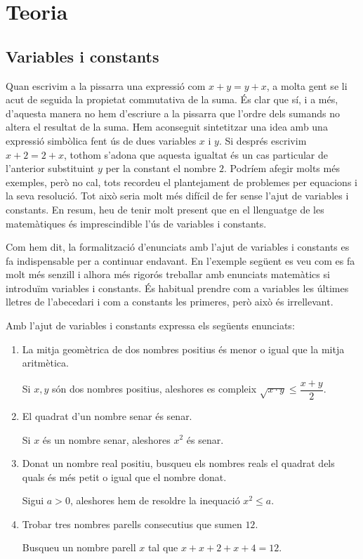 \chapter{Teoria}
\label{cap:teoria}

\section{Variables i constants}

Quan escrivim a la pissarra una expressió com $x+y=y+x$, a molta gent se
li acut de seguida la propietat commutativa de la suma. És clar que sí, i a més, d'aquesta manera no hem d'escriure a la pissarra que
l'ordre dels sumands no altera el resultat de la suma. Hem aconseguit
sintetitzar una idea amb una expressió simbòlica fent ús de dues
variables $x$ i $y$. Si després escrivim $x+2=2+x$, tothom s'adona que
aquesta igualtat és un cas particular de l'anterior substituint $y$ per
la constant el nombre $2$. Podríem afegir molts més exemples, però no cal, tots recordeu el plantejament de problemes per equacions i la
seva resolució. Tot això seria molt més difícil de fer
sense l'ajut de variables i constants. En resum, heu de tenir molt present
que en el llenguatge de les matemàtiques és imprescindible l'ús
de variables i constants.

Com hem dit, la formalització d'enunciats amb l'ajut de variables i
constants es fa indispensable per a continuar endavant. En l'exemple següent es veu com es fa molt més senzill i alhora més rigorós
treballar amb enunciats matemàtics si introduïm variables i
constants. És habitual prendre com a variables les últimes lletres
de l'abecedari i com a constants les primeres, però això és
irrellevant.

\begin{exemple}
Amb l'ajut de variables i constants expressa els següents enunciats:

\begin{enumerate}
\item La mitja geomètrica de dos nombres positius és menor o igual
que la mitja aritmètica.

Si $x,y$ són dos nombres positius, aleshores es compleix $\sqrt{x\cdot y}\leq\dfrac{x+y}{2}$.

\item El quadrat d'un nombre senar és senar.

Si $x$ és un nombre senar, aleshores $x^{2}$ és senar.

\item Donat un nombre real positiu, busqueu els nombres reals el quadrat
dels quals és més petit o igual que el nombre donat.

Sigui $a>0$, aleshores hem de resoldre la inequació $x^{2}\leq a$.

\item Trobar tres nombres parells consecutius que sumen $12$.

Busqueu un nombre parell $x$ tal que $x+x+2+x+4=12$.
\end{enumerate}
\end{exemple}

